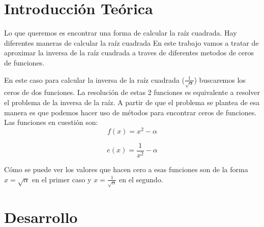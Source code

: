 \documentclass[10pt,a4paper]{article}
\begin{document}
\newpage
\section{Introducción Teórica}

Lo que queremos es encontrar una forma de calcular la raíz cuadrada. Hay diferentes maneras de calcular la raíz cuadrada%
En este trabajo vamos a tratar de aproximar la inversa de la raíz cuadrada a traves de diferentes metodos de ceros de funciones.

En este caso para calcular la inversa de la raíz cuadrada ($\displaystyle\frac{1}{\sqrt{\alpha}}$) buscaremos los ceros de dos funciones. La resolución de estas 2 funciones es equivalente a resolver el problema de la inversa de la raíz. A partir de que el problema se plantea de esa manera es que podemos hacer uso de métodos para encontrar ceros de funciones.\\

Las funciones en cuestión son:
\begin{displaymath}
    f(x) = x^2 - \alpha
\end{displaymath}

\begin{displaymath}
    e(x) = \frac{1}{x^2} - \alpha
\end{displaymath}

Cómo se puede ver los valores que hacen cero a esas funciones son de la forma $x = \sqrt{\alpha}$ en el primer caso y $x = \frac{1}{\sqrt{\alpha}}$ en el segundo.


\newpage
\section{Desarrollo}
\end{document}
